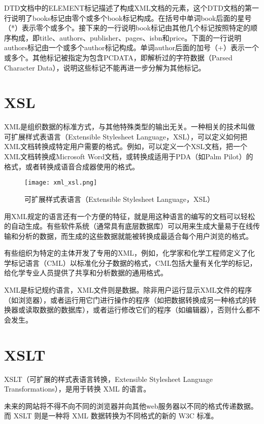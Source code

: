 DTD文档中的ELEMENT标记描述了构成XML文档的元素，这个DTD文档的第一行说明了books标记由零个或多个book标记构成。在括号中单词book后面的星号（*）表示零个或多个。接下来的一行说明book标记由其他几个标记按照特定的顺序构成，即title、authors、publisher、pages、isbn和price。下面的一行说明authors标记由一个或多个author标记构成。单词author后面的加号（+）表示一个或多个。其他标记被指定为包含PCDATA，即解析过的字符数据（Parsed Character Data），说明这些标记不能再进一步分解为其他标记。

\section{XSL}


XML是组织数据的标准方式，与其他特殊类型的输出无关。一种相关的技术叫做可扩展样式表语言（Extensible Stylesheet Language，XSL），可以定义如何把XML文档转换成特定用户需要的格式。例如，可以定义一个XSL文档，把一个XML文档转换成Microsoft Word文档，或转换成适用于PDA（如Palm Pilot）的格式，或者转换成语音合成器使用的格式。


\begin{figure}[!h]
\centering
\texttt{[image: xml\_xsl.png]}
\caption{可扩展样式表语言（Extensible Stylesheet Language，XSL）}
\label{xml_xsl}
\end{figure}

用XML规定的语言还有一个方便的特征，就是用这种语言的编写的文档可以轻松的自动生成。有些软件系统（通常具有底层数据库）可以用来生成大量易于在线传输和分析的数据，而生成的这些数据就能被转换成最适合每个用户浏览的格式。

有些组织为特定的主体开发了专用的XML，例如，化学家和化学工程师定义了化学标记语言（CML）以标准化分子数据的格式，CML包括大量有关化学的标记，给化学专业人员提供了共享和分析数据的通用格式。
	
XML是标记规约语言，XML文件则是数据。除非用户运行显示XML文件的程序（如浏览器），或者运行用它门进行操作的程序（如把数据转换成另一种格式的转换器或读取数据的数据库），或者运行修改它们的程序（如编辑器），否则什么都不会发生。


\section{XSLT}

XSLT（可扩展的样式表语言转换，Extensible Stylesheet Language Transformations），是用于转换 XML 的语言。

未来的网站将不得不向不同的浏览器并向其他web服务器以不同的格式传递数据。而 XSLT 则是一种将 XML 数据转换为不同格式的新的 W3C 标准。

